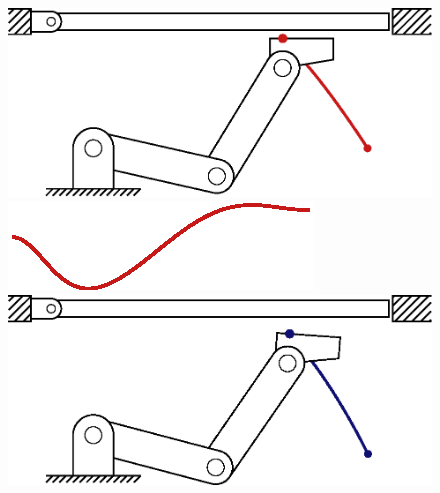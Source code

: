 \documentclass[../DC2019003Bouma.tex]{subfiles}
\begin{document}
\begin{figure}[bt!]
\begin{minipage}[c]{.3\textwidth}
\centering
    \includegraphics[width=\textwidth]{reference/frame29.eps}

\vspace{0.05cm}
	\begin{flushleft}
    \includegraphics[scale=0.55]{reference/refsnap_t87.eps}
	\end{flushleft}
    \includegraphics[width=\textwidth]{tracking/frame29.eps}


\end{minipage}
\end{figure}
\end{document}
